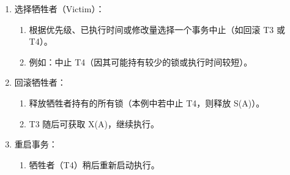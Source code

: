 \documentclass{article}
\begin{document}
	\begin{enumerate}[noitemsep, label={{\arabic*})}]
		\item 选择牺牲者（Victim）：
			\begin{enumerate}[noitemsep, label={· }]
				\item 根据优先级、已执行时间或修改量选择一个事务中止（如回滚 T3 或 T4）。
				\item 例如：中止 T4（因其可能持有较少的锁或执行时间较短）。
			\end{enumerate}\textbf{}
		\item 回滚牺牲者：
			\begin{enumerate}[noitemsep, label={· }]
				\item 释放牺牲者持有的所有锁（本例中若中止 T4，则释放 S(A)）。
				\item T3 随后可获取 X(A)，继续执行。
			\end{enumerate}\textbf{}
		\item 重启事务：
			\begin{enumerate}[noitemsep, label={· }]
				\item 牺牲者（T4）稍后重新启动执行。
			\end{enumerate}\textbf{}
	\end{enumerate}\textbf{}
	
\end{document}
